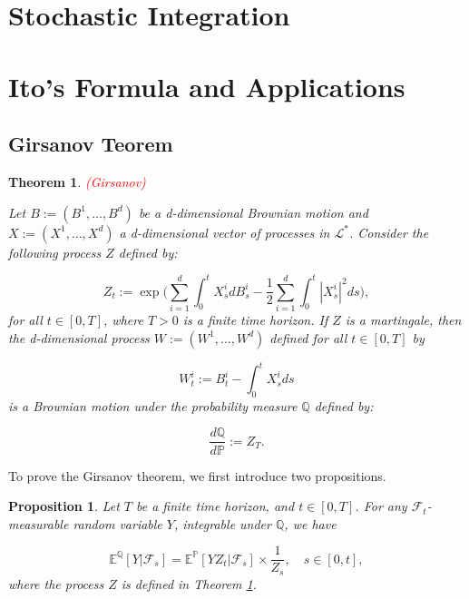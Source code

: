 \documentclass{article}
\newtheorem{theorem}{Theorem}
\newtheorem{prop}{Proposition}
\begin{document}
\section{Stochastic Integration}

\section{Ito's Formula and Applications}

\subsection{Girsanov Teorem}

\begin{theorem} \textcolor{red}{(Girsanov)} \label{thm:girsanov}

Let $B:=(B^1,...,B^d)$ be a d-dimensional Brownian motion and $X:=(X^1,...,X^d)$ a d-dimensional vector of processes in $\mathcal{L}^*$. Consider the following process $Z$ defined by:

\begin{equation}
Z_t:=\exp\Bigg(\sum^d_{i=1}\int^t_0X^i_sdB^i_s-\frac{1}{2}\sum^d_{i=1}\int^t_0|X^i_s|^2ds\Bigg),
\end{equation}
for all $t\in[0,T]$, where $T>0$ is a finite time horizon. If $Z$ is a martingale, then the d-dimensional process $W:=(W^1,...,W^d)$ defined for all $t\in[0,T]$ by 

\begin{equation} \label{girsanov:bm}
W_t^i:=B_t^i-\int^t_0X_s^ids
\end{equation}
is a Brownian motion under the probability measure $\mathbb{Q}$ defined by:

\begin{equation}
\frac{d\mathbb{Q}}{d\mathbb{P}}:=Z_T. 
\end{equation}
\end{theorem}

To prove the Girsanov theorem, we first introduce two propositions.

\begin{prop} \label{prop:cond_exp}
Let $T$ be a finite time horizon, and $t\in[0,T]$. For any $\mathcal{F}_t$-measurable random variable $Y$, integrable under $\mathbb{Q}$, we have

\begin{equation}
\mathbb{E}^\mathbb{Q}[Y|\mathcal{F}_s]=\mathbb{E}^\mathbb{P}[YZ_t|\mathcal{F}_s]\times\frac{1}{Z_s}, \quad s\in[0,t],
\end{equation}
where the process $Z$ is defined in Theorem \ref{thm:girsanov}.
\end{prop}
\end{document}

